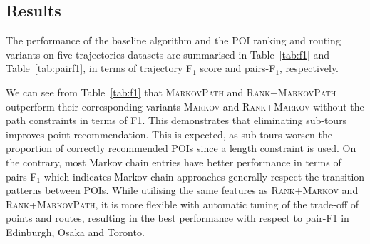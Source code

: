 \subsection{Results}
\label{sec:result}
\secmoveup

The performance of the baseline algorithm and the POI ranking and routing variants
on five trajectories datasets are summarised in Table~\ref{tab:f1}
and Table~\ref{tab:pairf1}, in terms of trajectory F$_1$ score and pairs-F$_1$, respectively.


We can see from Table~\ref{tab:f1} that \textsc{MarkovPath} and \textsc{Rank+MarkovPath}
outperform their corresponding variants \textsc{Markov} and \textsc{Rank+Markov} without the path constraints in terms of F1.
This demonstrates that eliminating sub-tours improves point recommendation.
This is expected, as sub-tours worsen the proportion of correctly
recommended POIs since a length constraint is used.
On the contrary, most Markov chain entries have better performance in terms of pairs-F$_1$
which indicates Markov chain approaches generally
respect the transition patterns between POIs.
%
While utilising the same features as \textsc{Rank+Markov} and \textsc{Rank+MarkovPath},
it is more flexible with automatic tuning of the trade-off of points and routes, resulting in
the best performance with respect to pair-F1 in Edinburgh, Osaka and Toronto.


